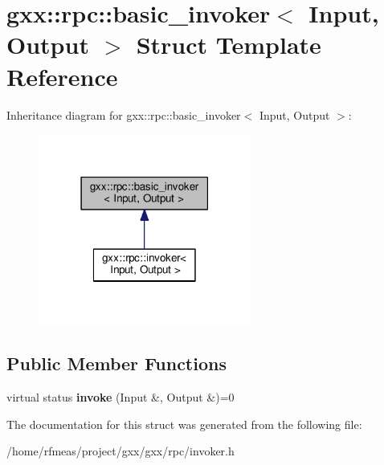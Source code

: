 \hypertarget{structgxx_1_1rpc_1_1basic__invoker}{}\section{gxx\+:\+:rpc\+:\+:basic\+\_\+invoker$<$ Input, Output $>$ Struct Template Reference}
\label{structgxx_1_1rpc_1_1basic__invoker}


Inheritance diagram for gxx\+:\+:rpc\+:\+:basic\+\_\+invoker$<$ Input, Output $>$\+:
\nopagebreak
\begin{figure}[H]
\begin{center}
\leavevmode
\includegraphics[width=198pt]{structgxx_1_1rpc_1_1basic__invoker__inherit__graph}
\end{center}
\end{figure}
\subsection*{Public Member Functions}
\begin{DoxyCompactItemize}
\item 
virtual status {\bfseries invoke} (Input \&, Output \&)=0\hypertarget{structgxx_1_1rpc_1_1basic__invoker_a2e5f0f0570a895e7c367384a6ccd67e3}{}\label{structgxx_1_1rpc_1_1basic__invoker_a2e5f0f0570a895e7c367384a6ccd67e3}

\end{DoxyCompactItemize}


The documentation for this struct was generated from the following file\+:\begin{DoxyCompactItemize}
\item 
/home/rfmeas/project/gxx/gxx/rpc/invoker.\+h\end{DoxyCompactItemize}
